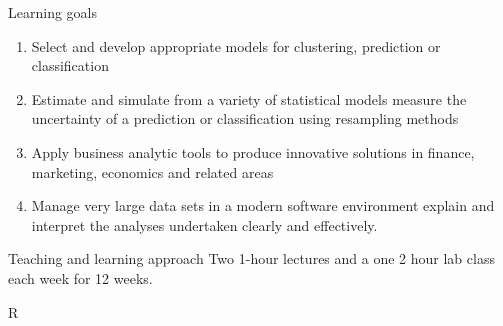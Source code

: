 \documentclass[14pt]{beamer}
\begin{document}
\begin{frame}{Learning goals}\fontsize{13}{14}\sf

\begin{enumerate}
\item Select and develop appropriate models for clustering, prediction or classification
\item Estimate and simulate from a variety of statistical models measure the uncertainty of a prediction or classification using resampling methods
\item Apply business analytic tools to produce innovative solutions in finance, marketing, economics and related areas
\item Manage very large data sets in a modern software environment explain and interpret the analyses undertaken clearly and effectively.
\end{enumerate}

\pause

\begin{alertblock}{Teaching and learning approach}
Two 1-hour lectures and a one 2 hour lab class each week for 12 weeks.
\end{alertblock}
\end{frame}

\begin{frame}{R}
 


\end{frame}
\end{document}
